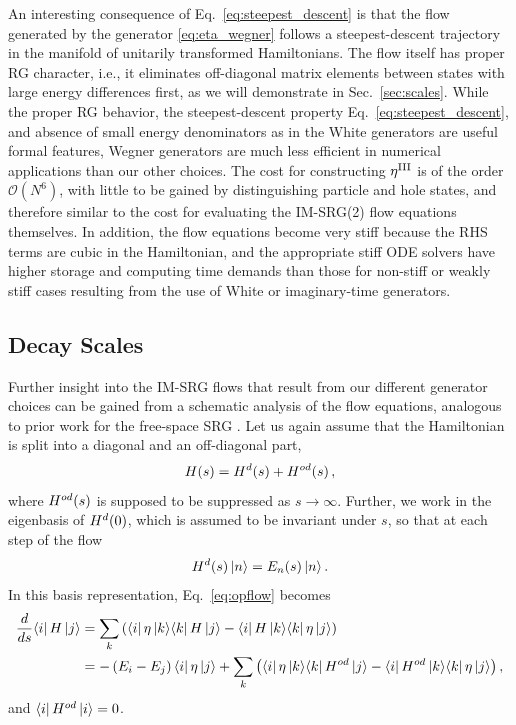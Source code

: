 An interesting consequence of Eq.~\eqref{eq:steepest_descent} is that the flow generated by the generator \eqref{eq:eta_wegner} follows a steepest-descent trajectory in the manifold of unitarily transformed Hamiltonians. The flow itself has proper RG character, i.e., it eliminates off-diagonal matrix elements between states with large energy differences first, as we will demonstrate in Sec.~\ref{sec:scales}. While the proper RG behavior, the steepest-descent property Eq.~\eqref{eq:steepest_descent}, and absence of small energy denominators as in the White generators are useful formal features, Wegner generators are much less efficient in numerical applications than our other choices. The cost for constructing $\eta^\text{III}$ is of the order $\mathcal{O}(N^6)$, with little to be gained by distinguishing particle and hole states, and therefore similar to the cost for evaluating the IM-SRG(2) flow equations themselves. In addition, the flow equations become very stiff because the RHS terms are cubic in the Hamiltonian, and the appropriate stiff ODE solvers have higher storage and computing time demands than those for non-stiff or weakly stiff cases resulting from the use of White or imaginary-time generators.


\subsection{\label{sec:scales}Decay Scales}
Further insight into the IM-SRG flows that result from our different generator choices can
be gained from a schematic analysis of the flow equations, analogous to prior work for
the free-space SRG \cite{Anderson:2008hx,Bogner:2010pq}.
Let us again assume that the Hamiltonian is split into a diagonal and an off-diagonal part,
\begin{equation}
  H(s)=H^d(s) + H^{od}(s)\,,
\end{equation}
where $H^{od}(s)$ is supposed to be suppressed as $s\to\infty$. Further, we work in the eigenbasis of $H^d(0)$, which is assumed to be invariant under $s$, so that at each step of the flow
\begin{equation}
  H^d(s)\,|{n}\rangle = E_n(s)\,|{n}\rangle\,.
\end{equation}
In this basis representation, Eq.~\eqref{eq:opflow} becomes
\begin{align}
   \frac{d {}} {d {s}} \langle{i}|\,{H}\,|{j}\rangle
  &=\sum_k\left(\langle{i}|\,{\eta}\,|{k}\rangle\langle{k}|\,{H}\,|{j}\rangle-\langle{i}|\,{H}\,|{k}\rangle\langle{k}|\,{\eta}\,|{j}\rangle\right)\notag\\
  &=-\left(E_i-E_j\right)\langle{i}|\,{\eta}\,|{j}\rangle
    +\sum_k\left(\langle{i}|\,{\eta}\,|{k}\rangle\langle{k}|\,{H^{od}}\,|{j}\rangle-\langle{i}|\,{H^{od}}\,|{k}\rangle\langle{k}|\,{\eta}\,|{j}\rangle\right),
\end{align}
and $\langle{i}|\,{H^{od}}\,|{i}\rangle=0$.

